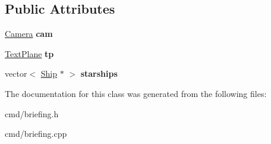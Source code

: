 \subsection*{Public Attributes}
\begin{DoxyCompactItemize}
\item 
\hyperlink{classCamera}{Camera} {\bfseries cam}\hypertarget{classBriefing_ab25597f74966f2c297a928186adedfd0}{}\label{classBriefing_ab25597f74966f2c297a928186adedfd0}

\item 
\hyperlink{classTextPlane}{Text\+Plane} {\bfseries tp}\hypertarget{classBriefing_a139ef177f32554429b513b3c03e4f003}{}\label{classBriefing_a139ef177f32554429b513b3c03e4f003}

\item 
vector$<$ \hyperlink{classBriefing_1_1Ship}{Ship} $\ast$ $>$ {\bfseries starships}\hypertarget{classBriefing_a992ac73bfdfbbaae28129b17ed66f5e8}{}\label{classBriefing_a992ac73bfdfbbaae28129b17ed66f5e8}

\end{DoxyCompactItemize}


The documentation for this class was generated from the following files\+:\begin{DoxyCompactItemize}
\item 
cmd/briefing.\+h\item 
cmd/briefing.\+cpp\end{DoxyCompactItemize}
